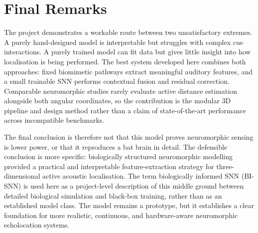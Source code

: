 \section{Final Remarks}

The project demonstrates a workable route between two unsatisfactory extremes. A purely hand-designed model is interpretable but struggles with complex cue interactions. A purely trained model can fit data but gives little insight into how localisation is being performed. The best system developed here combines both approaches: fixed biomimetic pathways extract meaningful auditory features, and a small trainable SNN performs contextual fusion and residual correction. Comparable neuromorphic studies rarely evaluate active distance estimation alongside both angular coordinates, so the contribution is the modular 3D pipeline and design method rather than a claim of state-of-the-art performance across incompatible benchmarks.

The final conclusion is therefore not that this model proves neuromorphic sensing is lower power, or that it reproduces a bat brain in detail. The defensible conclusion is more specific: biologically structured neuromorphic modelling provided a practical and interpretable feature-extraction strategy for three-dimensional active acoustic localisation. The term biologically informed SNN (BI-SNN) is used here as a project-level description of this middle ground between detailed biological simulation and black-box training, rather than as an established model class. The model remains a prototype, but it establishes a clear foundation for more realistic, continuous, and hardware-aware neuromorphic echolocation systems.
